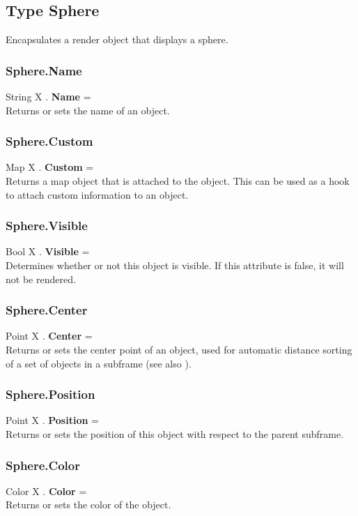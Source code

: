 \subsection{Type Sphere \label{T:Sphere}}
Encapsulates a render object that displays a sphere.

\subsubsection{Sphere.Name \label{F:Sphere:Name}}
String X . \textbf{Name} = \\
Returns or sets the name of an object.

\subsubsection{Sphere.Custom \label{F:Sphere:Custom}}
Map X . \textbf{Custom} = \\
Returns a map object that is attached to the object. This can be used as a hook to attach custom information to an object.


\subsubsection{Sphere.Visible \label{F:Sphere:Visible}}
Bool X . \textbf{Visible} = \\
Determines whether or not this object is visible. If this attribute is false, it will not be rendered.

\subsubsection{Sphere.Center \label{F:Sphere:Center}}
Point X . \textbf{Center} = \\
Returns or sets the center point of an object, used for automatic distance sorting of a set of objects in a subframe (see also ).

\subsubsection{Sphere.Position \label{F:Sphere:Position}}
Point X . \textbf{Position} = \\
Returns or sets the position of this object with respect to the parent subframe.

\subsubsection{Sphere.Color \label{F:Sphere:Color}}
Color X . \textbf{Color} = \\
Returns or sets the color of the object.

